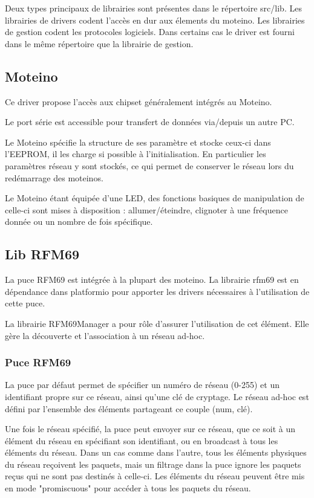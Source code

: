 \documentclass[a4paper]{report}
\begin{document}
Deux types principaux de librairies sont présentes dans le répertoire src/lib. Les librairies de drivers codent l'accès en dur aux élements du moteino. Les librairies de gestion codent les protocoles logiciels. Dans certains cas le driver est fourni dans le même répertoire que la librairie de gestion.

\subsection{Moteino}

Ce driver propose l'accès aux chipset généralement intégrés au Moteino.

Le port série est accessible pour transfert de données via/depuis un autre PC.

Le Moteino spécifie la structure de ses paramètre et stocke ceux-ci dans l'EEPROM, il les charge si possible à l'initialisation. En particulier les paramètres réseau y sont stockés, ce qui permet de conserver le réseau lors du redémarrage des moteinos.

Le Moteino étant équipée d'une LED, des fonctions basiques de manipulation de celle-ci sont mises à disposition : allumer/éteindre, clignoter à une fréquence donnée ou un nombre de fois spécifique.

\subsection{Lib RFM69}

La puce RFM69 est intégrée à la plupart des moteino. La librairie rfm69 est en dépendance dans platformio pour apporter les drivers nécessaires à l'utilisation de cette puce.

La librairie RFM69Manager a pour rôle d'assurer l'utilisation de cet élément. Elle  gère la découverte et l'association à un réseau ad-hoc.

\subsubsection{Puce RFM69}

La puce par défaut permet de spécifier un numéro de réseau (0-255) et un identifiant propre sur ce réseau, ainsi qu'une clé de cryptage. Le réseau ad-hoc est défini par l'ensemble des éléments partageant ce couple (num, clé).

Une fois le réseau spécifié, la puce peut envoyer sur ce réseau, que ce soit à un élément du réseau en spécifiant son identifiant, ou en broadcast à tous les éléments du réseau. Dans un cas comme dans l'autre, tous les éléments physiques du réseau reçoivent les paquets, mais un filtrage dans la puce ignore les paquets reçus qui ne sont pas destinés à celle-ci. Les éléments du réseau peuvent être mis en mode "promiscuous" pour accéder à tous les paquets du réseau.
\end{document}
